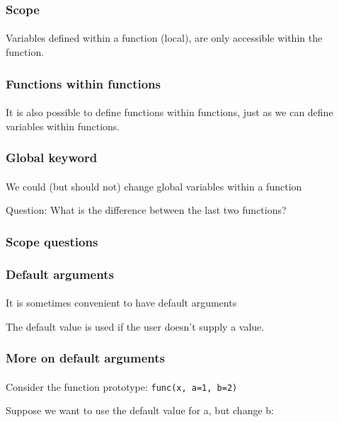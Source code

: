 \begin{frame}\frametitle{Scope}
    \framesubtitle{}

    Variables defined within a function (local), are only accessible within the function.

    \vfill


\end{frame}

\begin{frame}\frametitle{Functions within functions}
    \framesubtitle{}

    It is also possible to define functions within functions, just as we
    can define variables within functions.


\end{frame}

\begin{frame}\frametitle{Global keyword}
    \framesubtitle{}

    We could (but should not) change global variables within a function


   Question: What is the difference between the last two functions?

\end{frame}

\begin{frame}\frametitle{Scope questions}


\end{frame}

\begin{frame}\frametitle{Default arguments}
    \framesubtitle{}

    It is sometimes convenient to have default arguments


    The default value is used if the user doesn't supply a value.

\end{frame}

\begin{frame}\frametitle{More on default arguments}
    \framesubtitle{}

    Consider the function prototype: \texttt{func(x, a=1, b=2)}

    Suppose we want to use the default value for a, but change b:


\end{frame}

